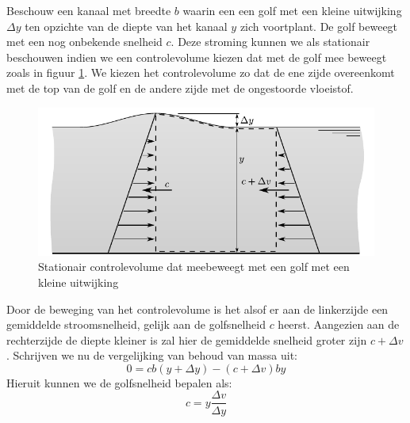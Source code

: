 Beschouw een kanaal met breedte $b$  waarin een een golf met een kleine uitwijking $\Delta y$ ten opzichte van de diepte van het kanaal $y$ zich voortplant. De golf beweegt met een nog onbekende snelheid $c$. Deze stroming kunnen we als stationair beschouwen indien we een controlevolume kiezen dat met de golf mee beweegt zoals in figuur \ref{fig:Golfsnelheid}. We kiezen het controlevolume zo dat de ene zijde overeenkomt met de top van de golf en de andere zijde met de ongestoorde vloeistof.
\begin{figure}[htb]
	\centering
	\includegraphics{fig/kanaalstroming/Golfsnelheid}
	\caption{Stationair controlevolume dat meebeweegt met een golf met een kleine uitwijking}
	\label{fig:Golfsnelheid}
\end{figure}
Door de beweging van het controlevolume is het alsof er aan de linkerzijde een gemiddelde stroomsnelheid, gelijk aan de golfsnelheid $c$ heerst. Aangezien aan de rechterzijde de diepte kleiner is zal hier de gemiddelde snelheid groter zijn $c+\Delta v$. Schrijven we nu de vergelijking van behoud van massa uit:
\begin{equation}
	0 = c b (y+\Delta y) - (c+\Delta v) b y 
\end{equation}
Hieruit kunnen we de golfsnelheid bepalen als:
\begin{equation}
	c = y \frac{\Delta v}{\Delta y}
	\label{eqn:golfsnelheid behoud van massa}
\end{equation}

